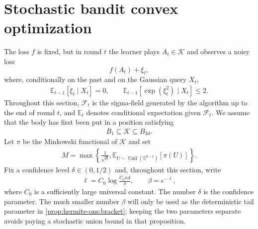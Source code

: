 \documentclass{article}
\theoremstyle{plain}
\theoremstyle{definition}
\theoremstyle{plain}
\newcommand{\E}{\mathbb E}
\newcommand{\cK}{\mathcal K}
\begin{document}
\newpage
\section{Stochastic bandit convex optimization}
The loss $f$ is fixed,
but in round $t$ the learner plays $A_t\in\cK$ and observes a noisy loss
\[
    f(A_t)+\xi_t,
\]
where, conditionally on the past and on the Gaussian query $X_t$,
\begin{align}
    \E_{t-1}[\xi_t\mid X_t]=0,
    \qquad
    \E_{t-1}[\exp(\xi_t^2)\mid X_t]\leq2.
    \label{eq:direct-stoch-noise}
\end{align}
Throughout this section, $\mathcal F_t$ is the sigma-field generated by
the algorithm up to the end of round $t$, and $\E_t$ denotes conditional
expectation given $\mathcal F_t$.
We assume that the body has first been put in a position satisfying
\begin{align}
    B_1\subseteq\cK\subseteq B_{2d}.
    \label{eq:direct-stoch-rounded}
\end{align}
Let $\pi$ be the Minkowski functional of $\cK$ and set
\begin{align}
    M=\max\left\{
    \frac1{\sqrt d},
    \E_{U\sim\operatorname{Unif}(\mathbb S^{d-1})}[\pi(U)]
    \right\}.
    \label{eq:direct-stoch-M}
\end{align}
Fix a confidence level $\delta\in(0,1/2)$ and, throughout this section,
write
\begin{align}
    \ell=C_0\log\frac{C_0nd}{\delta},
    \qquad
    \beta=e^{-\ell},
    \label{eq:direct-stoch-log-factor}
\end{align}
where $C_0$ is a sufficiently large universal constant.  The number
$\delta$ is the confidence parameter.  The much smaller number $\beta$
will only be used as the deterministic tail parameter in
\cref{prop:hermite-ons:bracket}; keeping the two parameters separate
avoids paying a stochastic union bound in that proposition.
\end{document}
